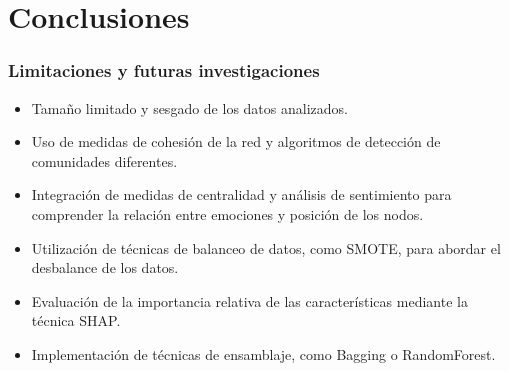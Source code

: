\documentclass{beamer}
\begin{document}
\section{Conclusiones}
%	
%	
%	
%	
%



\begin{frame}
	\frametitle{Limitaciones y futuras investigaciones}
	
	\begin{itemize}
		\item Tamaño limitado y sesgado de los datos analizados.
		\item Uso de medidas de cohesión de la red y algoritmos de detección de comunidades diferentes.
		\item Integración de medidas de centralidad y análisis de sentimiento para comprender la relación entre emociones y posición de los nodos.
		\item Utilización de técnicas de balanceo de datos, como SMOTE, para abordar el desbalance de los datos.
		\item Evaluación de la importancia relativa de las características mediante la técnica SHAP.
		\item Implementación de técnicas de ensamblaje, como Bagging o RandomForest.
	\end{itemize}
\end{frame}
\end{document}

